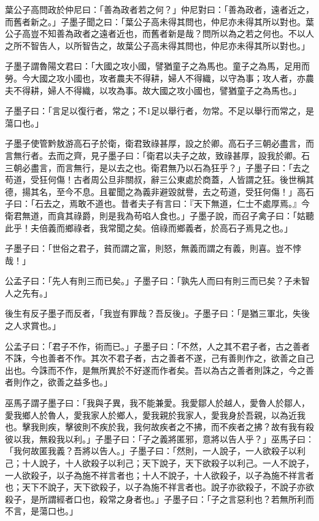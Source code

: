 \begin{pinyinscope}
葉公子高問政於仲尼曰：「善為政者若之何？」仲尼對曰：「善為政者，遠者近之，而舊者新之。」子墨子聞之曰：「葉公子高未得其問也，仲尼亦未得其所以對也。葉公子高豈不知善為政者之遠者近也，而舊者新是哉？問所以為之若之何也。不以人之所不智告人，以所智告之，故葉公子高未得其問也，仲尼亦未得其所以對也。」

子墨子謂魯陽文君曰：「大國之攻小國，譬猶童子之為馬也。童子之為馬，足用而勞。今大國之攻小國也，攻者農夫不得耕，婦人不得織，以守為事；攻人者，亦農夫不得耕，婦人不得織，以攻為事。故大國之攻小國也，譬猶童子之為馬也。」

子墨子曰：「言足以復行者，常之；不1足以舉行者，勿常。不足以舉行而常之，是蕩口也。」

子墨子使管黔敖游高石子於衛，衛君致祿甚厚，設之於卿。高石子三朝必盡言，而言無行者。去而之齊，見子墨子曰：「衛君以夫子之故，致祿甚厚，設我於卿。石三朝必盡言，而言無行，是以去之也。衛君無乃以石為狂乎？」子墨子曰：「去之苟道，受狂何傷！古者周公旦非關叔，辭三公東處於商蓋，人皆謂之狂。後世稱其德，揚其名，至今不息。且翟聞之為義非避毀就譽，去之苟道，受狂何傷！」高石子曰：「石去之，焉敢不道也。昔者夫子有言曰：『天下無道，仁士不處厚焉。』今衛君無道，而貪其祿爵，則是我為苟啗人食也。」子墨子說，而召子禽子曰：「姑聽此乎！夫倍義而鄉祿者，我常聞之矣。倍祿而鄉義者，於高石子焉見之也。」

子墨子曰：「世俗之君子，貧而謂之富，則怒，無義而謂之有義，則喜。豈不悖哉！」

公孟子曰：「先人有則三而已矣。」子墨子曰：「孰先人而曰有則三而已矣？子未智人之先有。」

後生有反子墨子而反者，「我豈有罪哉？吾反後」。子墨子曰：「是猶三軍北，失後之人求賞也。」

公孟子曰：「君子不作，術而已。」子墨子曰：「不然，人之其不君子者，古之善者不誅，今也善者不作。其次不君子者，古之善者不遂，己有善則作之，欲善之自己出也。今誅而不作，是無所異於不好遂而作者矣。吾以為古之善者則誅之，今之善者則作之，欲善之益多也。」

巫馬子謂子墨子曰：「我與子異，我不能兼愛。我愛鄒人於越人，愛魯人於鄒人，愛我鄉人於魯人，愛我家人於鄉人，愛我親於我家人，愛我身於吾親，以為近我也。擊我則疾，擊彼則不疾於我，我何故疾者之不拂，而不疾者之拂？故有我有殺彼以我，無殺我以利。」子墨子曰：「子之義將匿邪，意將以告人乎？」巫馬子曰：「我何故匿我義？吾將以告人。」子墨子曰：「然則，一人說子，一人欲殺子以利己；十人說子，十人欲殺子以利己；天下說子，天下欲殺子以利己。一人不說子，一人欲殺子，以子為施不祥言者也；十人不說子，十人欲殺子，以子為施不祥言者也；天下不說子，天下欲殺子，以子為施不祥言者也。說子亦欲殺子，不說子亦欲殺子，是所謂經者口也，殺常之身者也。」子墨子曰：「子之言惡利也？若無所利而不言，是蕩口也。」


\end{pinyinscope}
